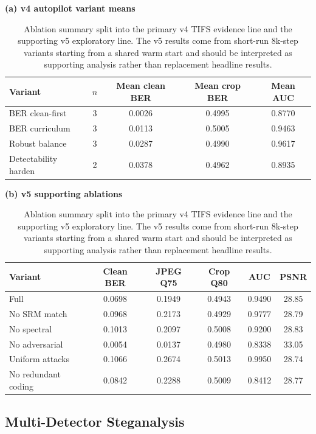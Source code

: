 \documentclass[journal]{IEEEtran}
\begin{document}
\begin{table}[t]
\centering
\caption{Ablation summary split into the primary v4 TIFS evidence line and the supporting v5 exploratory line. The v5 results come from short-run $8$k-step variants starting from a shared warm start and should be interpreted as supporting analysis rather than replacement headline results.}
\label{tab:ablation_table}
\begin{minipage}{0.48\textwidth}
\centering
\textbf{(a) v4 autopilot variant means}\par\vspace{0.3em}
\footnotesize
\begin{tabular}{l c c c c}
\toprule
Variant & $n$ & Mean clean BER & Mean crop BER & Mean AUC \\
\midrule
BER clean-first & 3 & 0.0026 & 0.4995 & 0.8770 \\
BER curriculum & 3 & 0.0113 & 0.5005 & 0.9463 \\
Robust balance & 3 & 0.0287 & 0.4990 & 0.9617 \\
Detectability harden & 2 & 0.0378 & 0.4962 & 0.8935 \\
\bottomrule
\end{tabular}
\end{minipage}\hfill
\begin{minipage}{0.48\textwidth}
\centering
\textbf{(b) v5 supporting ablations}\par\vspace{0.3em}
\footnotesize
\begin{tabular}{l c c c c c}
\toprule
Variant & Clean BER & JPEG Q75 & Crop Q80 & AUC & PSNR \\
\midrule
Full & 0.0698 & 0.1949 & 0.4943 & 0.9490 & 28.85 \\
No SRM match & 0.0968 & 0.2173 & 0.4929 & 0.9777 & 28.79 \\
No spectral & 0.1013 & 0.2097 & 0.5008 & 0.9200 & 28.83 \\
No adversarial & 0.0054 & 0.0137 & 0.4980 & 0.8338 & 33.05 \\
Uniform attacks & 0.1066 & 0.2674 & 0.5013 & 0.9950 & 28.74 \\
No redundant coding & 0.0842 & 0.2288 & 0.5009 & 0.8412 & 28.77 \\
\bottomrule
\end{tabular}
\end{minipage}
\end{table}

\subsection{Multi-Detector Steganalysis}
\label{sec:multi_detector}
\end{document}
